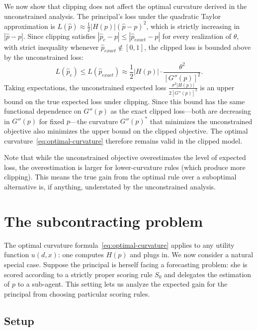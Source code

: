 \documentclass[11pt]{article}
\begin{document}
We now show that clipping does not affect the optimal curvature derived in the unconstrained analysis. The principal's loss under the quadratic Taylor approximation is $L(\hat{p}) \approx \frac{1}{2}|H(p)|(\hat{p} - p)^2$, which is strictly increasing in $|\hat{p} - p|$. Since clipping satisfies $|\hat{p}_c - p| \leq |\hat{p}_{exact} - p|$ for every realization of $\theta$, with strict inequality whenever $\hat{p}_{exact} \notin [0,1]$, the clipped loss is bounded above by the unconstrained loss:
\begin{equation}
	L(\hat{p}_c) \leq L(\hat{p}_{exact}) \approx \frac{1}{2}|H(p)| \cdot \frac{\theta^2}{[G''(p)]^2}.
\end{equation}
Taking expectations, the unconstrained expected loss $\frac{\sigma^2 |H(p)|}{2[G''(p)]^2}$ is an upper bound on the true expected loss under clipping. Since this bound has the same functional dependence on $G''(p)$ as the exact clipped loss---both are decreasing in $G''(p)$ for fixed $p$---the curvature $G''(p)^*$ that minimizes the unconstrained objective also minimizes the upper bound on the clipped objective. The optimal curvature~\eqref{eq:optimal-curvature} therefore remains valid in the clipped model.

Note that while the unconstrained objective overestimates the level of expected loss, the overestimation is larger for lower-curvature rules (which produce more clipping). This means the true gain from the optimal rule over a suboptimal alternative is, if anything, understated by the unconstrained analysis.

\section{The subcontracting problem}\label{sec:subcontracting}

The optimal curvature formula~\eqref{eq:optimal-curvature} applies to any utility function $u(d, x)$: one computes $H(p)$ and plugs in. We now consider a natural special case. Suppose the principal is herself facing a forecasting problem: she is scored according to a strictly proper scoring rule $S_0$ and delegates the estimation of $p$ to a sub-agent. This setting lets us analyze the expected gain for the principal from choosing particular scoring rules.

\subsection{Setup}
\end{document}
